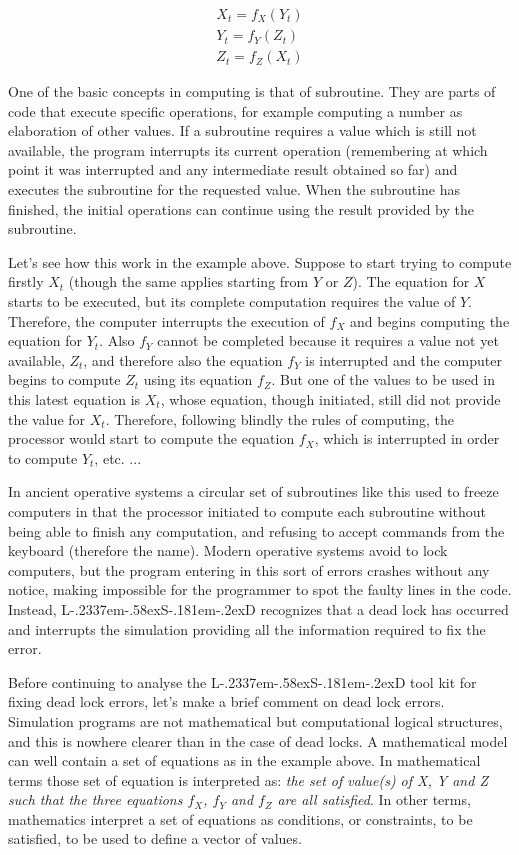 \documentclass [11pt,a4paper] {book}
\def\LsD{{L\kern-.2337em\lower-.58ex\hbox{S}\kern-.181em\lower-.2ex\hbox{D}}\xspace}
\begin{document}
  \begin{eqnarray}
    X_t = f_X(Y_t) \nonumber  \\
    Y_t = f_Y(Z_t) \nonumber\\
    Z_t = f_Z(X_t) \nonumber
  \end{eqnarray}

One of the basic concepts in computing is that of subroutine. They are parts of code that
execute specific operations, for example computing a number as elaboration of other
values. If a subroutine requires a value which is still not available, the program
interrupts its current operation (remembering at which point it was interrupted and any
intermediate result obtained so far) and executes the subroutine for the requested value.
When the subroutine has finished, the initial operations can continue using the result provided by
the subroutine.

Let's see how this work in the example above. Suppose to start trying to compute firstly $X_t$ (though the same
applies starting from $Y$ or $Z$). The equation for $X$ starts to be executed, but its
complete computation requires the value of $Y$. Therefore, the computer interrupts the
execution of $f_X$ and begins computing the equation for $Y_t$. Also $f_Y$ cannot be
completed because it requires a value not yet available, $Z_t$, and therefore also the
equation $f_Y$ is interrupted and the computer begins to compute $Z_t$ using its equation
$f_Z$. But one of the values to be used in this latest equation is $X_t$, whose equation,
though initiated, still did not provide the value for $X_t$. Therefore, following blindly
the rules of computing, the processor would start to compute the equation $f_X$, which is
interrupted in order to compute $Y_t$, etc. ...

In ancient operative systems a circular set of subroutines like this used to freeze
computers in that the processor initiated to compute each subroutine without being able
to finish any computation, and refusing to accept commands from the keyboard (therefore
the name). Modern operative systems avoid to lock computers, but the program entering in
this sort of errors crashes without any notice, making impossible for the programmer to
spot the faulty lines in the code. Instead, \LsD recognizes that a dead lock has occurred
and interrupts the simulation providing all the information required to fix the error.

Before continuing to analyse the \LsD tool kit for fixing dead lock errors, let's make a
brief comment on dead lock errors. Simulation programs are not mathematical but
computational logical structures, and this is nowhere clearer than in the case of dead
locks. A mathematical model can well contain a set of equations as in the example above.
In mathematical terms those set of equation is interpreted as: \textit{the set of value(s) of X, Y and Z such that the three equations $f_X$, $f_Y$ and $f_Z$ are all satisfied}. In other terms, mathematics interpret a set of equations as conditions, or constraints, to be satisfied, to be used to define a vector of values.
\end{document}

